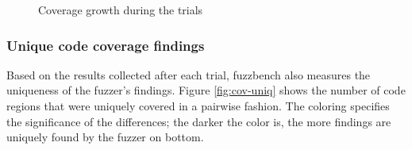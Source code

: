 \begin{figure}
    \caption{Coverage growth during the trials}
    \label{fig:cov-growth}
\end{figure}

\subsubsection{Unique code coverage findings}

Based on the results collected after each trial, fuzzbench also measures the uniqueness of the fuzzer's findings. Figure \ref{fig:cov-uniq} shows the number of code regions that were uniquely covered in a pairwise fashion. The coloring specifies the significance of the differences; the darker the color is, the more findings are uniquely found by the fuzzer on bottom.


